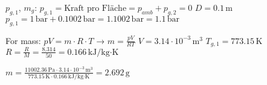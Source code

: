 \( p_{g,1} \), \( m_g \):  
\( p_{g,1} = \text{Kraft pro Fläche} = p_{amb} + p_{g,2} = 0 \)  
\( D = 0.1 \, \text{m} \)  
\( p_{g,1} = 1 \, \text{bar} + 0.1002 \, \text{bar} = 1.1002 \, \text{bar} = 1.1 \, \text{bar} \)  

For mass:  
\( pV = m \cdot R \cdot T \) → \( m = \frac{pV}{RT} \)  
\( V = 3.14 \cdot 10^{-3} \, \text{m}^3 \)  
\( T_{g,1} = 773.15 \, \text{K} \)  
\( R = \frac{R}{M} = \frac{8.314}{50} = 0.166 \, \text{kJ/kg·K} \)  

\( m = \frac{11002.36 \, \text{Pa} \cdot 3.14 \cdot 10^{-3} \, \text{m}^3}{773.15 \, \text{K} \cdot 0.166 \, \text{kJ/kg·K}} = 2.692 \, \text{g} \)